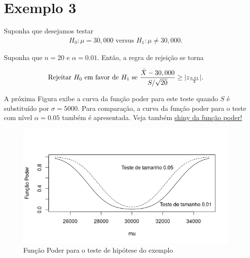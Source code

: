 \documentclass[12pt]{beamer}
\begin{document}
\section{Exemplo 3}
\begin{frame}{}
\begin{block}{}
\justifying
Suponha que desejamos testar
\begin{align}
H_0 : \mu = 30,000 \text{ versus } H_1 : \mu \neq 30,000. 
\end{align}

Suponha que $n = 20$ e $\alpha = 0.01$. Então, a regra de rejeição se torna

\begin{align}
\text{Rejeitar } H_0 \text{ em favor de } H_1 \text{ se } \frac{\Bar{X} - 30,000}{S/\sqrt{20}} \geq |z_{\frac{0.01}{2}}|.
\end{align}

A próxima Figura exibe a curva da função poder para este teste quando $S$ é substituído por $\sigma = 5000$. Para comparação, a curva da função poder para o teste com nível $\alpha = 0.05$ também é apresentada. Veja também \href{https://est711.shinyapps.io/FuncaoPoder/}{shiny da função poder!}
\end{block}
\end{frame}


\begin{frame}{}
\begin{block}{}
\justifying
\begin{figure}
    \centering
    \includegraphics[scale=0.6]{figs/FunctionPower.png}
    \caption{Função Poder para o teste de hipótese do exemplo}
    \label{fig:enter-label}
\end{figure}
\end{block}
\end{frame}
\end{document}
